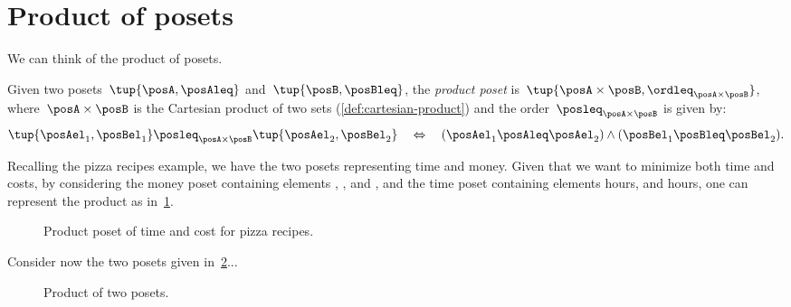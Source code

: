 
\section{Product of posets}
We can think of the product of posets.

\begin{definition}
  \label{def:productposet}
  Given two posets~$\tup{\posA, \posAleq}$
  and~$\tup{\posB, \posBleq}$, the \emph{product poset} is~$\tup{\posA \times \posB, \ordleq_{\posA\times \posB}}$, where~$\posA \times \posB$ is the Cartesian product of two sets (\cref{def:cartesian-product}) and the order~$\posleq_{\posA \times \posB}$ is given by:
  \begin{equation}
    \tup{\posAel_1, \posBel_1}
    \posleq_{\posA\times \posB}
    \tup{\posAel_2, \posBel_2}
    \quad
    \Leftrightarrow
    \quad
    (\posAel_1 \posAleq \posAel_2) \wedge
    (\posBel_1 \posBleq \posBel_2).
  \end{equation}
\end{definition}
Recalling the pizza recipes example, we have the two posets representing time and money.
Given that we want to minimize both time and costs, by considering the money poset containing elements \unit[1]{\stdcurr}, \unit[2]{\stdcurr}, and \unit[3]{\stdcurr}, and the time poset containing elements \unit[1]{hours}, and \unit[2]{hours}, one can represent the product as in~\cref{fig:productpizza}.

\begin{figure}[h!]
  \begin{center}
  \end{center}
  \caption{Product poset of time and cost for pizza recipes.}
  \label{fig:productpizza}
\end{figure}


\begin{example}
  Consider now the two posets given in~\cref{fig:composing_posets_1}...
  \begin{figure}[h!]
    \begin{center}
    \end{center}
    \caption{Product of two posets.\label{fig:composing_posets_1}}
  \end{figure}
\end{example}

